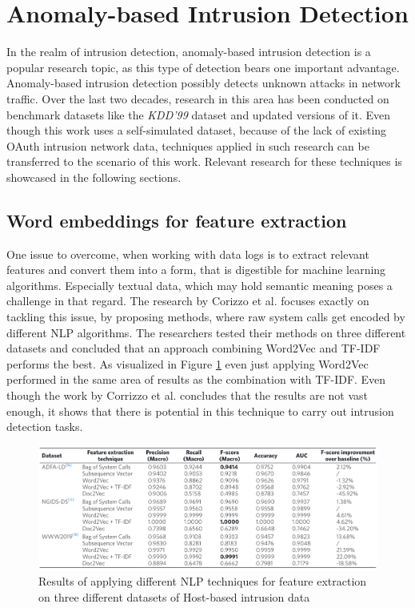 \documentclass[
    fontsize=12pt,
    headings=small,
    parskip=half,           %
    bibliography=totoc,
    numbers=noenddot,       %
    open=any,               %
    ]{scrreprt}
\begin{document}
\section{Anomaly-based Intrusion Detection}
\label{sec:anomaly_based_intrusion_detection}
In the realm of intrusion detection, anomaly-based intrusion detection is a popular research topic, as this type of detection bears one important advantage. Anomaly-based intrusion detection possibly detects unknown attacks in network traffic. Over the last two decades, research in this area has been conducted on benchmark datasets like the \emph{KDD’99} dataset \cite{kdd1999} and updated versions of it. Even though this work uses a self-simulated dataset, because of the lack of existing OAuth intrusion network data, techniques applied in such research can be transferred to the scenario of this work. Relevant research for these techniques is showcased in the following sections.

\subsection{Word embeddings for feature extraction}
One issue to overcome, when working with data logs is to extract relevant features and convert them into a form, that is digestible for machine learning algorithms. Especially textual data, which may hold semantic meaning poses a challenge in that regard. The research by Corizzo et al. \cite{corizzo2020feature} focuses exactly on tackling this issue, by proposing methods, where raw system calls get encoded by different NLP algorithms. The researchers tested their methods on three different datasets and concluded that an approach combining Word2Vec and TF-IDF performs the best. As visualized in Figure \ref{fig:w2v_feat_extr} even just applying Word2Vec performed in the same area of results as the combination with TF-IDF. Even though the work by Corrizzo et al. concludes that the results are not vast enough, it shows that there is potential in this technique to carry out intrusion detection tasks.

\begin{figure}[H]
	\sffamily\footnotesize
	\includegraphics[width=1\textwidth]{pic/w2v_feat_extr.png}
	\unitlength=0.75mm
	\linethickness{0.4pt}
	\caption{Results of applying different NLP techniques for feature extraction on three different datasets of Host-based intrusion data \cite{corizzo2020feature}}
	\label{fig:w2v_feat_extr}
\end{figure}
\end{document}

